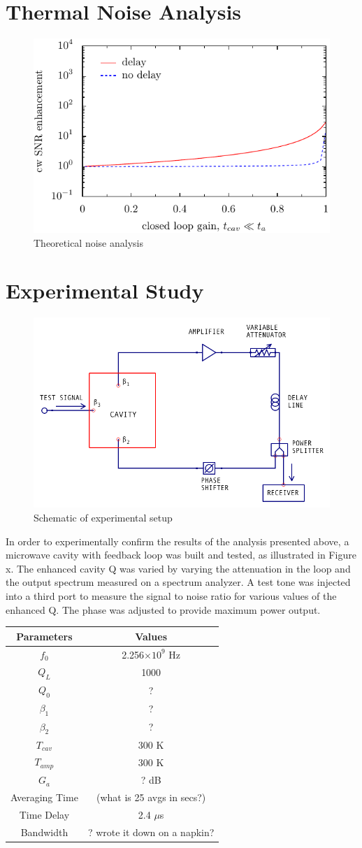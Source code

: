 \documentclass[aps,prl,twocolumn,groupedaddress]{revtex4-1}
\begin{document}
\section{Thermal Noise Analysis}

\begin{figure}[htbp]
\includegraphics[width=.5\textwidth]{figs/looking_at_coth}
\caption{Theoretical noise analysis}
\label{fig:analysis}
\end{figure}
\section{Experimental Study}

\begin{figure}[htbp]
\includegraphics[width=.5\textwidth]{figs/no_isolator}
\caption{Schematic of experimental setup}
\label{fig:schematic_of_prototype}
\end{figure}
In order to experimentally confirm the results of the analysis presented above, a microwave cavity with feedback loop was built and tested, as illustrated in Figure x. The enhanced cavity Q was varied by varying the attenuation in the loop and the output spectrum measured on a spectrum analyzer. A test tone was injected into a third port to measure the signal to noise ratio for various values of the enhanced Q. The phase was adjusted to provide maximum power output.\\

\begin{tabular}{|c|c|}
\hline
Parameters & Values \\ \hline
$f_0$ & 2.256$\times 10^9$ Hz \\
$Q_L$ & 1000 \\
$Q_0$ & ? \\
$\beta_1$ & ? \\
$\beta_2$ & ? \\
$T_{cav}$ & 300 K \\
$T_{amp}$ & 300 K \\
$G_a$ & ? dB \\
Averaging Time & (what is 25 avgs in secs?) \\
Time Delay & 2.4 $\mu$s \\
Bandwidth & ? wrote it down on a napkin? \\
\hline
\end{tabular}\\
\end{document}
